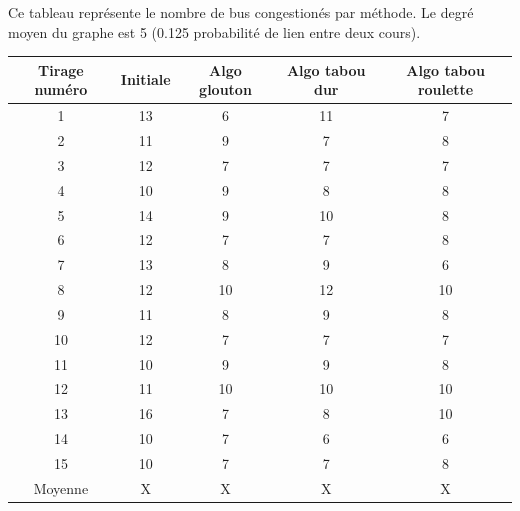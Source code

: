 \documentclass[a4paper,11pt]{article}
\begin{document}
	Ce tableau représente le nombre de bus congestionés par méthode. Le degré moyen du graphe est 5 (0.125 probabilité de lien entre deux cours).\\ 
	\begin{tabular}{|c|c|c|c|c|}
  		\hline
  		Tirage numéro & Initiale & Algo glouton & Algo tabou dur & Algo tabou roulette\\
  		\hline
  		1 & 13 & 6 & 11 & 7\\
  		\hline
  		2 & 11 & 9 & 7 & 8\\
  		\hline
  		3 & 12 & 7 & 7 & 7\\
  		\hline
  		4 & 10 & 9 & 8 & 8\\
  		\hline
  		5 & 14 & 9 & 10 & 8\\
  		\hline
  		6 & 12 & 7 & 7 & 8\\
  		\hline
  		7 & 13 & 8 & 9 & 6\\
  		\hline
  		8 & 12 & 10 & 12 & 10\\
  		\hline
  		9 & 11 & 8 & 9 & 8\\
  		\hline
  		10 & 12 & 7 & 7 & 7\\
  		\hline
  		11 & 10 & 9 & 9 & 8\\
  		\hline
  		12 & 11 & 10 & 10 & 10\\
  		\hline
  		13 & 16 & 7 & 8 & 10\\
  		\hline
  		14 & 10 & 7 & 6 & 6\\
  		\hline
  		15 & 10 & 7 & 7 & 8\\
  		\hline
  		Moyenne & X & X & X & X\\
  		\hline
	\end{tabular}
\end{document}

